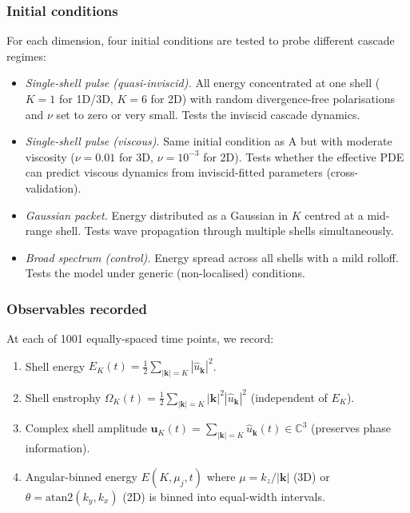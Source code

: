 \documentclass[11pt,a4paper]{article}
\theoremstyle{remark}
\newcommand{\C}{\mathbb{C}}
\begin{document}
\subsubsection{Initial conditions}

For each dimension, four initial conditions are tested to probe different cascade regimes:
\begin{itemize}
\item[\textbf{A}:] \emph{Single-shell pulse (quasi-inviscid).}  All energy concentrated at one shell ($K=1$ for 1D/3D, $K=6$ for 2D) with random divergence-free polarisations and $\nu$ set to zero or very small.  Tests the inviscid cascade dynamics.
\item[\textbf{B}:] \emph{Single-shell pulse (viscous).}  Same initial condition as A but with moderate viscosity ($\nu = 0.01$ for 3D, $\nu = 10^{-3}$ for 2D).  Tests whether the effective PDE can predict viscous dynamics from inviscid-fitted parameters (cross-validation).
\item[\textbf{C}:] \emph{Gaussian packet.}  Energy distributed as a Gaussian in $K$ centred at a mid-range shell.  Tests wave propagation through multiple shells simultaneously.
\item[\textbf{D}:] \emph{Broad spectrum (control).}  Energy spread across all shells with a mild rolloff.  Tests the model under generic (non-localised) conditions.
\end{itemize}

\subsubsection{Observables recorded}

At each of 1001 equally-spaced time points, we record:
\begin{enumerate}
\item Shell energy $E_K(t) = \frac{1}{2}\sum_{|\mathbf{k}|=K} |\hat{u}_{\mathbf{k}}|^2$.
\item Shell enstrophy $\Omega_K(t) = \frac{1}{2}\sum_{|\mathbf{k}|=K} |\mathbf{k}|^2 |\hat{u}_{\mathbf{k}}|^2$ (independent of $E_K$).
\item Complex shell amplitude $\mathbf{u}_K(t) = \sum_{|\mathbf{k}|=K} \hat{u}_{\mathbf{k}}(t) \in \C^3$ (preserves phase information).
\item Angular-binned energy $E(K, \mu_j, t)$ where $\mu = k_z/|\mathbf{k}|$ (3D) or $\theta = \mathrm{atan2}(k_y, k_x)$ (2D) is binned into equal-width intervals.
\end{enumerate}
\end{document}
